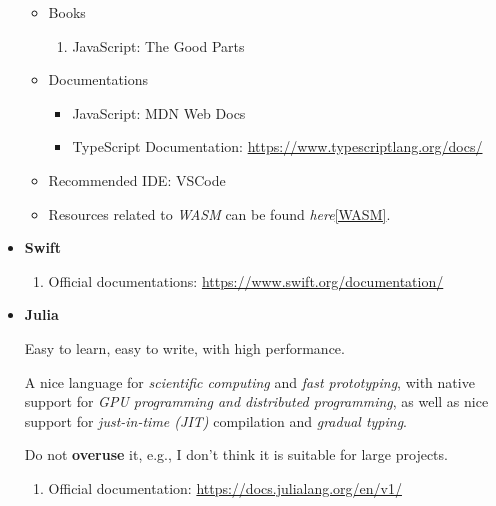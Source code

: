 \documentclass{article}
\begin{document}
\begin{itemize}
\begin{itemize}
    \item Books
    \begin{enumerate}
        \item JavaScript: The Good Parts
        \cite{crockford2008javascript}
    \end{enumerate}
    \item Documentations
    \begin{itemize}
        \item JavaScript: MDN Web Docs
        \item TypeScript Documentation:
        \href{https://www.typescriptlang.org/docs/}{https://www.typescriptlang.org/docs/}
    \end{itemize}
    \item Recommended IDE: VSCode
    \item Resources related to \emph{WASM} can be found \emph{here}\ref{WASM}.
\end{itemize}
\item \textbf{Swift}
\begin{enumerate}
    \item Official documentations:
    \href{https://www.swift.org/documentation/}{https://www.swift.org/documentation/}
\end{enumerate}
\item \textbf{Julia}

Easy to learn, easy to write, with high performance.

A nice language for \emph{scientific computing} and \emph{fast prototyping}, with native support for \emph{GPU programming and distributed programming}, as well as nice support for \emph{just-in-time (JIT)} compilation and \emph{gradual typing}.

Do not \textbf{overuse} it, e.g., I don't think it is suitable for large projects.

\begin{enumerate}
    \item Official documentation:
    \href{https://docs.julialang.org/en/v1/}{https://docs.julialang.org/en/v1/}
\end{enumerate}

\end{itemize}
\end{document}
